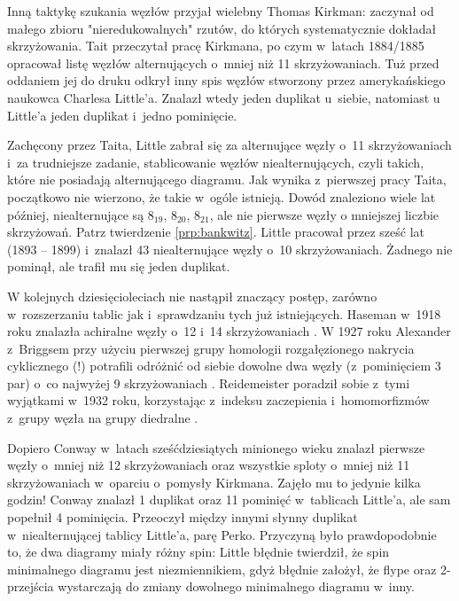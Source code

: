 Inną taktykę szukania węzłów przyjał wielebny Thomas Kirkman: zaczynał od małego zbioru "nieredukowalnych" rzutów, do których systematycznie dokładał skrzyżowania.
Tait przeczytał pracę Kirkmana, po czym w~latach 1884/1885 opracował listę węzłów alternujących o~mniej niż 11 skrzyżowaniach.
Tuż przed oddaniem jej do druku odkrył inny spis węzłów stworzony przez amerykańskiego naukowca Charlesa Little'a.
Znalazł wtedy jeden duplikat u~siebie, natomiast u Little'a jeden duplikat i~jedno pominięcie.

Zachęcony przez Taita, Little zabrał się za alternujące węzły o~11 skrzyżowaniach i~za trudniejsze zadanie, stablicowanie węzłów niealternujących, czyli takich, które nie posiadają alternującego diagramu.
Jak wynika z~pierwszej pracy Taita, początkowo nie wierzono, że takie w~ogóle istnieją.
Dowód znaleziono wiele lat później, niealternujące są $8_{19}$, $8_{20}$, $8_{21}$, ale nie pierwsze węzły o mniejszej liczbie skrzyżowań.
Patrz twierdzenie \ref{prp:bankwitz}.
Little pracował przez sześć lat (1893 -- 1899) i~znalazł 43 niealternujące węzły o~10 skrzyżowaniach.
Żadnego nie pominął, ale trafił mu się jeden duplikat.

W kolejnych dziesięcioleciach nie nastąpił znaczący postęp, zarówno w~rozszerzaniu tablic jak i~sprawdzaniu tych już istniejących.
Haseman w~1918 roku znalazła achiralne węzły o~12 i~14 skrzyżowaniach \cite{haseman18}.
W 1927 roku Alexander z~Briggsem przy użyciu pierwszej grupy homologii rozgałęzionego nakrycia cyklicznego (!) potrafili odróżnić od siebie dowolne dwa węzły (z~pominięciem 3 par) o~co najwyżej 9 skrzyżowaniach \cite{briggs27}.
Reidemeister poradził sobie z~tymi wyjątkami w~1932 roku, korzystając z~indeksu zaczepienia i~homomorfizmów z~grupy węzła na grupy diedralne \cite{reidemeister32}.


Dopiero Conway w~latach sześćdziesiątych minionego wieku znalazł pierwsze węzły o~mniej niż 12 skrzyżowaniach oraz wszystkie sploty o~mniej niż 11 skrzyżowaniach w~oparciu o~pomysły Kirkmana.
Zajęło mu to jedynie kilka godzin!
Conway znalazł 1 duplikat oraz 11 pominięć w~tablicach Little'a, ale sam popełnił 4 pominięcia.
Przeoczył między innymi słynny duplikat w~niealternującej tablicy Little'a, parę Perko.
Przyczyną było prawdopodobnie to, że dwa diagramy miały różny spin:
Little błędnie twierdził, że spin minimalnego diagramu jest niezmiennikiem, gdyż błędnie założył, że flype oraz 2-przejścia wystarczają do zmiany dowolnego minimalnego diagramu w~inny.

